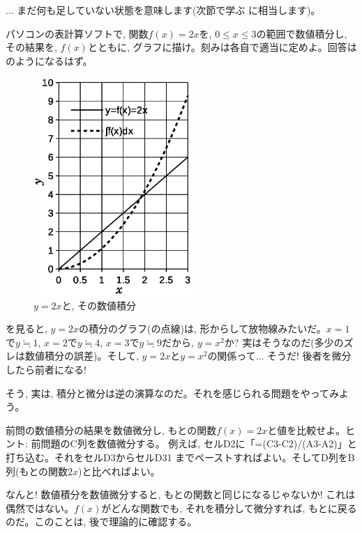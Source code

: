 \begin{faq}{\small{} ... 
まだ何も足していない状態を意味します(次節で学ぶ
に相当します)。}\end{faq}

\begin{q}\label{q:int03x2} パソコンの表計算ソフトで, 関数$f(x)=2x$を, 
$0 \le x \le 3$の範囲で数値積分し, その結果を, $f(x)$とともに, 
グラフに描け。刻みは各自で適当に定めよ。回答は
のようになるはず。
\end{q}\mv

\begin{figure}[h]
    \centering
    \includegraphics[width=6cm]{int03x2.eps}
    \caption{$y=2x$と, その数値積分}\label{fig:int03x2}
\end{figure}

を見ると, $y=2x$の積分のグラフ(の点線)は, 
形からして放物線みたいだ。$x=1$で$y\fallingdotseq1$, $x=2$で$y\fallingdotseq4$, 
$x=3$で$y\fallingdotseq9$だから, $y=x^2$か? 
実はそうなのだ(多少のズレは数値積分の誤差)。そして, 
$y=2x$と$y=x^2$の関係って... そうだ! 後者を微分したら前者になる!

そう, 実は, 積分と微分は逆の演算なのだ。それを感じられる問題をやってみよう。

\begin{q}\label{q:int03x2_diff} 前問の数値積分の結果を数値微分し, 
もとの関数$f(x)=2x$と値を比較せよ。ヒント: 前問題のC列を数値微分する。
例えば, セルD2に「=(C3-C2)/(A3-A2)」と打ち込む。それをセルD3からセルD31
までペーストすればよい。そしてD列をB列(もとの関数$2x$)と比べればよい。
\end{q}\mv

なんと! 数値積分を数値微分すると, もとの関数と同じになるじゃないか! 
これは偶然ではない。$f(x)$がどんな関数でも, それを積分して微分すれば, 
もとに戻るのだ。このことは, 後で理論的に確認する。

